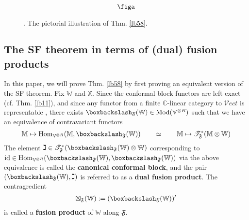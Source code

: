 \documentclass[11pt,b5paper,notitlepage]{article}
\theoremstyle{definition}
\theoremstyle{plain}
\newcommand{\Hom}{\mathrm{Hom}}
\newcommand{\Vect}{\mathcal Vect}
\newcommand{\Vbb}{\mathbb V}
\newcommand{\Xbb}{\mathbb X}
\newcommand{\Wbb}{\mathbb W}
\newcommand{\Mbb}{\mathbb M}
\newcommand{\Cbb}{\mathbb C}
\newcommand{\<}{\left\langle}
\renewcommand{\>}{\right\rangle}
\newcommand{\ST}{\mathscr{T}}
\newcommand{\bbs}{\boxbackslash}
\newcommand{\Mod}{\mathrm{Mod}}
\newcommand{\id}{\mathrm{id}}
\newcommand{\ff}{\mathfrak{F}}
\numberwithin{equation}{section}
\begin{document}
\begin{figure}[h]

	\centering

\begin{align*}
\figa
\end{align*}

	\caption{. The pictorial illustration of Thm. \ref{lb58}.}
	\label{fig3}
\end{figure} 





\subsection{The SF theorem in terms of (dual) fusion products}


In this paper, we will prove Thm. \ref{lb58} by first proving an equivalent version of the SF theorem. Fix $\Wbb$ and $\Xbb$. Since the conformal block functors are left exact (cf. Thm. \ref{lb11}), and since any functor from a finite $\Cbb$-linear category to $\Vect$ is representable \cite[Cor. 1.10]{DSPS19-balanced}, there exists $\bbs_\ff(\Wbb)\in\Mod(\Vbb^{\otimes R})$ such that we have an equivalence of contravariant functors
\begin{align}\label{eq119}
\Mbb\mapsto\Hom_{\Vbb^{\otimes R}}(\Mbb,\bbs_\ff(\Wbb))\qquad\simeq\qquad\Mbb\mapsto\ST^*_\ff(\Mbb\otimes\Wbb)
\end{align}
The element $\gimel\in\ST^*_\ff(\bbs_\ff(\Wbb)\otimes\Wbb)$ corresponding to $\id\in\Hom_{\Vbb^{\otimes R}}(\bbs_\ff(\Wbb),\bbs_\ff(\Wbb))$ via the above equivalence is called the \textbf{canonical conformal block}, and the pair $(\bbs_\ff(\Wbb),\gimel)$ is referred to as a \textbf{dual fusion product}. The contragredient
\begin{align*}
\boxtimes_\ff(\Wbb):=(\bbs_\ff(\Wbb))'
\end{align*}
is called a \textbf{fusion product} of $\Wbb$ along $\ff$.
\end{document}
